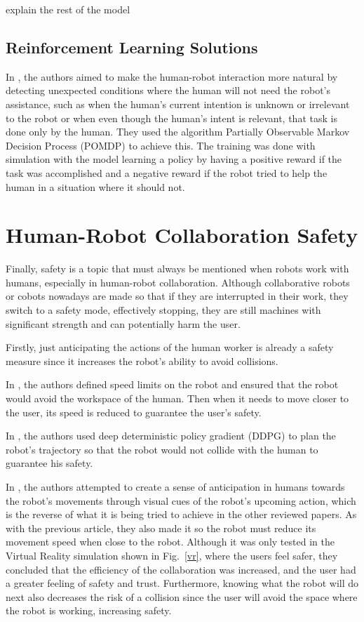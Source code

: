 {\color{red} explain the rest of the model}

\subsection{Reinforcement Learning Solutions}

In \cite{Gorur2018}, the authors aimed to make the human-robot interaction more natural by detecting unexpected conditions where the human will not need the robot's assistance, such as when the human's current intention is unknown or irrelevant to the robot or when even though the human's intent is relevant, that task is done only by the human. They used the algorithm Partially Observable Markov Decision Process (POMDP) to achieve this. The training was done with simulation with the model learning a policy by having a positive reward if the task was accomplished and a negative reward if the robot tried to help the human in a situation where it should not.

\section{Human-Robot Collaboration Safety}

Finally, safety is a topic that must always be mentioned when robots work with humans, especially in human-robot collaboration. Although collaborative robots or cobots nowadays are made so that if they are interrupted in their work, they switch to a safety mode, effectively stopping, they are still machines with significant strength and can potentially harm the user.

Firstly, just anticipating the actions of the human worker is already a safety measure since it increases the robot's ability to avoid collisions.

In \cite{Zhang2022}, the authors defined speed limits on the robot and ensured that the robot would avoid the workspace of the human. Then when it needs to move closer to the user, its speed is reduced to guarantee the user's safety.

In \cite{Wu2023}, the authors used deep deterministic policy gradient (DDPG) to plan the robot's trajectory so that the robot would not collide with the human to guarantee his safety.

In \cite{Psarakis2022}, the authors attempted to create a sense of anticipation in humans towards the robot's movements through visual cues of the robot's upcoming action, which is the reverse of what it is being tried to achieve in the other reviewed papers. As with the previous article, they also made it so the robot must reduce its movement speed when close to the robot. Although it was only tested in the Virtual Reality simulation shown in Fig.~\ref{vr}, where the users feel safer, they concluded that the efficiency of the collaboration was increased, and the user had a greater feeling of safety and trust. Furthermore, knowing what the robot will do next also decreases the risk of a collision since the user will avoid the space where the robot is working, increasing safety.

